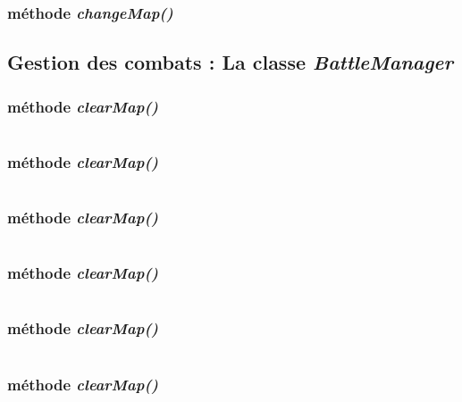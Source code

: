 \documentclass[11pt]{article}
\begin{document}
\subsubsection{méthode \textit{changeMap()}}
\subsection{Gestion des combats : La classe \textit{BattleManager}}
\subsubsection{méthode \textit{clearMap()}}
\begin{lstlisting}[language=JavaScript]

\end{lstlisting} 
\subsubsection{méthode \textit{clearMap()}}
\begin{lstlisting}[language=JavaScript]

\end{lstlisting} 
\subsubsection{méthode \textit{clearMap()}}
\begin{lstlisting}[language=JavaScript]

\end{lstlisting} 
\subsubsection{méthode \textit{clearMap()}}
\begin{lstlisting}[language=JavaScript]

\end{lstlisting} 
\subsubsection{méthode \textit{clearMap()}}
\begin{lstlisting}[language=JavaScript]

\end{lstlisting} 
\subsubsection{méthode \textit{clearMap()}}
\begin{lstlisting}[language=JavaScript]

\end{lstlisting} 
\end{document}
